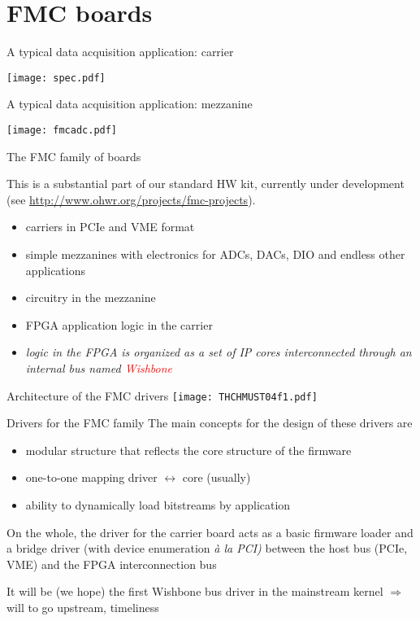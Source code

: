 \documentclass[compress,red]{beamer}
\begin{document}
\section{FMC boards}

\begin{frame}{A typical data acquisition application: carrier}
\begin{center}
\texttt{[image: spec.pdf]}
\end{center}
\end{frame}

\begin{frame}{A typical data acquisition application: mezzanine}
\begin{center}
\texttt{[image: fmcadc.pdf]}
\end{center}
\end{frame}

\begin{frame}{The FMC family of boards}

This is a substantial part of our standard HW kit, currently under
development\\
(see \url{http://www.ohwr.org/projects/fmc-projects}).

\begin{itemize}
\item carriers in PCIe and VME format
\item simple mezzanines with electronics for ADCs, DACs, DIO and endless
    other applications
\item circuitry in the mezzanine
\item FPGA application logic in the carrier
\item \emph{logic in the FPGA is organized as a set of IP cores
    interconnected through an internal bus named
    \textcolor{red}{Wishbone}}
\end{itemize}
\end{frame}

\begin{frame}{Architecture of the FMC drivers}
\texttt{[image: THCHMUST04f1.pdf]}
\end{frame}

\begin{frame}{Drivers for the FMC family}
The main concepts for the design of these drivers are
\begin{itemize}
\pause
\item modular structure that reflects the core structure of the firmware
\pause
\item one-to-one mapping driver $\leftrightarrow$ core (usually)
\pause
\item ability to dynamically load bitstreams by application
\end{itemize}

\pause
On the whole, the driver for the carrier board acts as a basic firmware
loader and a bridge driver (with device enumeration
\emph{\`a la PCI)} between the host bus (PCIe, VME) and the FPGA
interconnection bus

\pause
It will be (we hope) the first Wishbone bus driver in the mainstream
kernel $\Rightarrow$ will to go upstream, timeliness
\end{frame}
\end{document}
